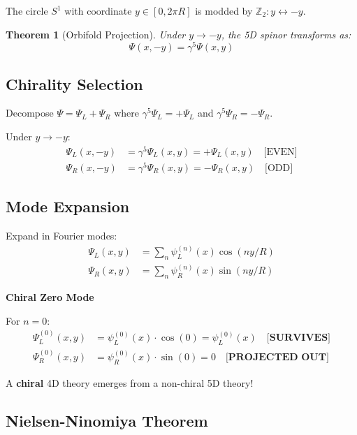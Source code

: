 \documentclass[12pt,a4paper]{article}
\newtheorem{theorem}{Theorem}[section]
\theoremstyle{definition}
\theoremstyle{remark}
\begin{document}
The circle $S^1$ with coordinate $y \in [0, 2\pi R]$ is modded by $\mathbb{Z}_2: y \leftrightarrow -y$.

\begin{theorem}[Orbifold Projection]
Under $y \to -y$, the 5D spinor transforms as:
\begin{equation}
\boxed{\Psi(x, -y) = \gamma^5 \Psi(x, y)}
\end{equation}
\end{theorem}

\subsection{Chirality Selection}

Decompose $\Psi = \Psi_L + \Psi_R$ where $\gamma^5 \Psi_L = +\Psi_L$ and $\gamma^5 \Psi_R = -\Psi_R$.

Under $y \to -y$:
\begin{align}
\Psi_L(x, -y) &= \gamma^5 \Psi_L(x, y) = +\Psi_L(x, y) \quad \text{[EVEN]} \\
\Psi_R(x, -y) &= \gamma^5 \Psi_R(x, y) = -\Psi_R(x, y) \quad \text{[ODD]}
\end{align}

\subsection{Mode Expansion}

Expand in Fourier modes:
\begin{align}
\Psi_L(x, y) &= \sum_n \psi_L^{(n)}(x) \cos(ny/R) \\
\Psi_R(x, y) &= \sum_n \psi_R^{(n)}(x) \sin(ny/R)
\end{align}

\begin{keyresult}
\textbf{Chiral Zero Mode}

For $n = 0$:
\begin{align}
\Psi_L^{(0)}(x, y) &= \psi_L^{(0)}(x) \cdot \cos(0) = \psi_L^{(0)}(x) \quad \textbf{[SURVIVES]} \\
\Psi_R^{(0)}(x, y) &= \psi_R^{(0)}(x) \cdot \sin(0) = 0 \quad \textbf{[PROJECTED OUT]}
\end{align}

A \textbf{chiral} 4D theory emerges from a non-chiral 5D theory!
\end{keyresult}

\subsection{Nielsen-Ninomiya Theorem}
\end{document}
